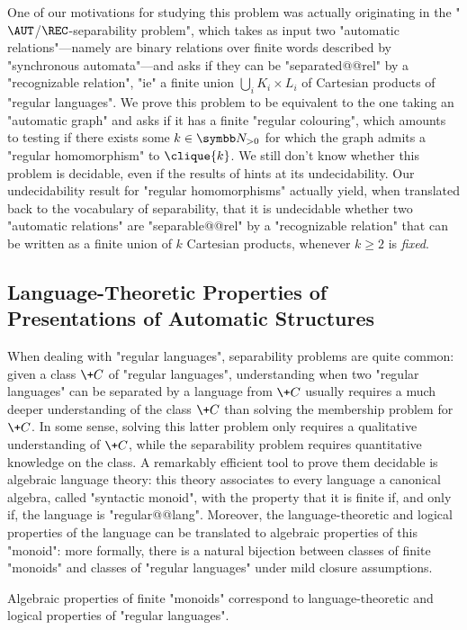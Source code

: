 One of our motivations for studying this problem was actually originating
in the "$\AUT$/$\REC$-separability problem", which takes as input two "automatic relations"---namely are binary relations over finite words described by "synchronous automata"---and asks if they can be
"separated@@rel" by a "recognizable relation", "ie" a finite union $\bigcup_i K_i \times L_i$
of Cartesian products of "regular languages". 
We prove this problem to be equivalent to the one taking an "automatic graph" and asks
if it has a finite "regular colouring", which amounts to testing
if there exists some $k\in\Np$ for which the graph admits a "regular homomorphism" to
$\clique{k}$. We still don't know whether this problem is decidable, 
even if the results of  hints at its undecidability.
Our undecidability result for "regular homomorphisms"
actually yield, when translated back to the vocabulary of separability,
that it is undecidable whether two "automatic relations" are "separable@@rel"
by a "recognizable relation" that can be written as
a finite union of $k$ Cartesian products, whenever $k \geq 2$ is \emph{fixed}.

\subsection{Language-Theoretic Properties of Presentations of Automatic Structures}

When dealing with "regular languages",
separability problems are quite common:
given a class $\+C$ of "regular languages", understanding
when two "regular languages" can be separated by a language from $\+C$
usually requires a much deeper understanding of the class $\+C$ than
solving the membership problem for $\+C$. In some sense, solving
this latter problem only requires a qualitative understanding of $\+C$,
while the separability problem requires quantitative knowledge on the class. 
A remarkably efficient tool
to prove them decidable is algebraic language theory:
this theory associates to every language a canonical algebra, called "syntactic monoid",
with the property that it is finite if, and only if, the language is "regular@@lang".
Moreover, the language-theoretic and logical properties of the language can be
translated to algebraic properties of this "monoid": more formally, there is a natural
bijection between classes of finite "monoids" and classes of
"regular languages" under mild closure assumptions.

\begin{known}
	Algebraic properties of finite "monoids" correspond to
	language-theoretic and logical properties of "regular languages".
\end{known}

